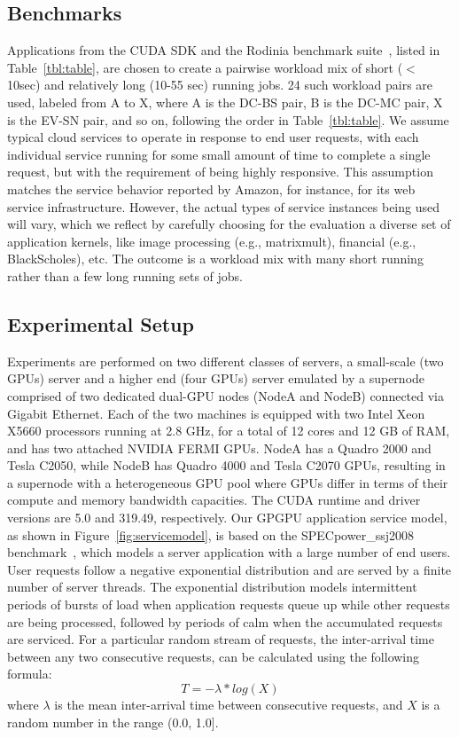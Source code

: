 \subsection{Benchmarks}
Applications from the CUDA SDK and the Rodinia benchmark suite~\cite{rodinia}, listed in Table~\ref{tbl:table}, are chosen to create a pairwise workload mix of short ($<$ 10sec) and relatively long (10-55 sec) running jobs. 24 such workload pairs are used, labeled from A to X, where A is the DC-BS pair, B is the DC-MC pair, X is the EV-SN pair, and so on, following the order in Table~\ref{tbl:table}. We assume typical cloud services to operate in response to end user requests, with each individual service running for some small amount of time to complete a single request, but with the requirement of being highly responsive. This assumption matches the service behavior reported by Amazon, for instance, for its web service infrastructure. However, the actual types of service instances being used will vary, which we reflect by carefully choosing for the evaluation a diverse set of application kernels, like image processing (e.g., matrixmult), financial (e.g., BlackScholes), etc. The outcome is a workload mix with many short running rather than a few long running sets of jobs.

\subsection{Experimental Setup}
Experiments are performed on two different classes of servers, a small-scale (two GPUs) server and a higher end (four GPUs) server emulated by a supernode comprised of two dedicated dual-GPU nodes (NodeA and NodeB) connected via Gigabit Ethernet. Each of the two machines is equipped with two Intel Xeon X5660 processors running at 2.8 GHz, for a total of 12 cores and 12 GB of RAM, and has two attached NVIDIA FERMI GPUs. NodeA has a Quadro 2000 and Tesla C2050, while NodeB has Quadro 4000 and Tesla C2070 GPUs, resulting in a supernode with a heterogeneous GPU pool where GPUs differ in terms of their compute and memory bandwidth capacities. The CUDA runtime and driver versions are 5.0 and 319.49, respectively. Our GPGPU application service model, as shown in Figure~\ref{fig:servicemodel}, is based on the SPECpower\_ssj2008 benchmark~\cite{spec}, which models a server application with a large number of end users. User requests follow a negative exponential distribution and are served by a finite  number  of  server  threads. The  exponential distribution models intermittent periods of bursts of load when application requests queue up while  other  requests are being processed, followed by  periods of  calm  when  the  accumulated  requests  are  serviced.  For a particular random stream of requests, the inter-arrival time between any two consecutive requests, can be calculated using the following formula:  
\begin{equation}
T = - \lambda*log(X)
\end{equation}
where $\lambda$ is the mean inter-arrival time between consecutive requests, and $X$ is a random number in the range (0.0, 1.0].

